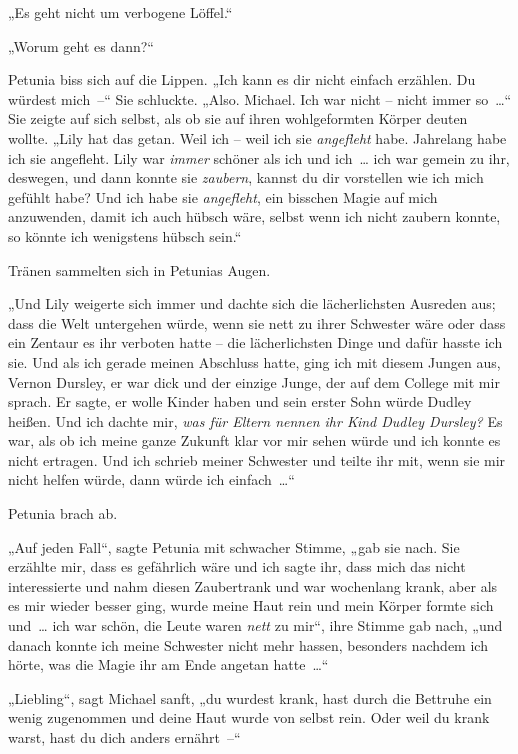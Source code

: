 „Es geht nicht um verbogene Löffel.“

„Worum geht es dann?“

Petunia biss sich auf die Lippen. „Ich kann es dir nicht einfach erzählen. Du würdest mich –“ Sie schluckte. „Also. Michael. Ich war nicht – nicht immer so …“ Sie zeigte auf sich selbst, als ob sie auf ihren wohlgeformten Körper deuten wollte. „Lily hat das getan. Weil ich – weil ich sie \emph{angefleht} habe. Jahrelang habe ich sie angefleht. Lily war \emph{immer} schöner als ich und ich … ich war gemein zu ihr, deswegen, und dann konnte sie \emph{zaubern}, kannst du dir vorstellen wie ich mich gefühlt habe? Und ich habe sie \emph{angefleht}, ein bisschen Magie auf mich anzuwenden, damit ich auch hübsch wäre, selbst wenn ich nicht zaubern konnte, so könnte ich wenigstens hübsch sein.“

Tränen sammelten sich in Petunias Augen.

„Und Lily weigerte sich immer und dachte sich die lächerlichsten Ausreden aus; dass die Welt untergehen würde, wenn sie nett zu ihrer Schwester wäre oder dass ein Zentaur es ihr verboten hatte – die lächerlichsten Dinge und dafür hasste ich sie. Und als ich gerade meinen Abschluss hatte, ging ich mit diesem Jungen aus, Vernon Dursley, er war dick und der einzige Junge, der auf dem College mit mir sprach. Er sagte, er wolle Kinder haben und sein erster Sohn würde Dudley heißen. Und ich dachte mir, \emph{was für Eltern nennen ihr Kind Dudley Dursley?} Es war, als ob ich meine ganze Zukunft klar vor mir sehen würde und ich konnte es nicht ertragen. Und ich schrieb meiner Schwester und teilte ihr mit, wenn sie mir nicht helfen würde, dann würde ich einfach …“

Petunia brach ab.

„Auf jeden Fall“, sagte Petunia mit schwacher Stimme, „gab sie nach. Sie erzählte mir, dass es gefährlich wäre und ich sagte ihr, dass mich das nicht interessierte und nahm diesen Zaubertrank und war wochenlang krank, aber als es mir wieder besser ging, wurde meine Haut rein und mein Körper formte sich und … ich war schön, die Leute waren \emph{nett} zu mir“, ihre Stimme gab nach, „und danach konnte ich meine Schwester nicht mehr hassen, besonders nachdem ich hörte, was die Magie ihr am Ende angetan hatte …“

„Liebling“, sagt Michael sanft, „du wurdest krank, hast durch die Bettruhe ein wenig zugenommen und deine Haut wurde von selbst rein. Oder weil du krank warst, hast du dich anders ernährt –“

